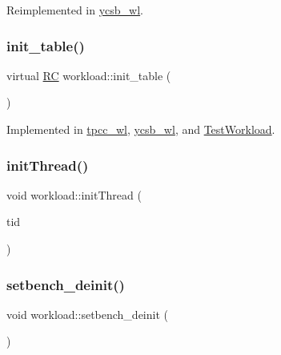 Reimplemented in \hyperlink{classycsb__wl_a3f1937f438c251831694b39b6e9dc36d}{ycsb\+\_\+wl}.

\mbox{\label{classworkload_a3feee79af04069f6c1ad6b7f9b0a045a}} 
\subsubsection{\texorpdfstring{init\+\_\+table()}{init\_table()}}
{\footnotesize\ttfamily virtual \hyperlink{global_8h_a78c49a674c810fdd03d20432f7be864a}{RC} workload\+::init\+\_\+table (\begin{DoxyParamCaption}{ }\end{DoxyParamCaption})\hspace{0.3cm}{\ttfamily [pure virtual]}}



Implemented in \hyperlink{classtpcc__wl_a84fd48d9c4ee95eb6176e9fdf9efd8b7}{tpcc\+\_\+wl}, \hyperlink{classycsb__wl_a2e1e8d6e68e5312a82cfe09ec4bb26a6}{ycsb\+\_\+wl}, and \hyperlink{classTestWorkload_a4963c5307360dc96391779393a1571dc}{Test\+Workload}.

\mbox{\label{classworkload_ad33bfab447c5741ca4cf22b0deb5948e}} 
\subsubsection{\texorpdfstring{init\+Thread()}{initThread()}}
{\footnotesize\ttfamily void workload\+::init\+Thread (\begin{DoxyParamCaption}\item[{const int}]{tid }\end{DoxyParamCaption})}

\mbox{\label{classworkload_a4614189e85fbaaf2003b7db4c2a7b8b9}} 
\subsubsection{\texorpdfstring{setbench\+\_\+deinit()}{setbench\_deinit()}}
{\footnotesize\ttfamily void workload\+::setbench\+\_\+deinit (\begin{DoxyParamCaption}{ }\end{DoxyParamCaption})\hspace{0.3cm}{\ttfamily [virtual]}}



